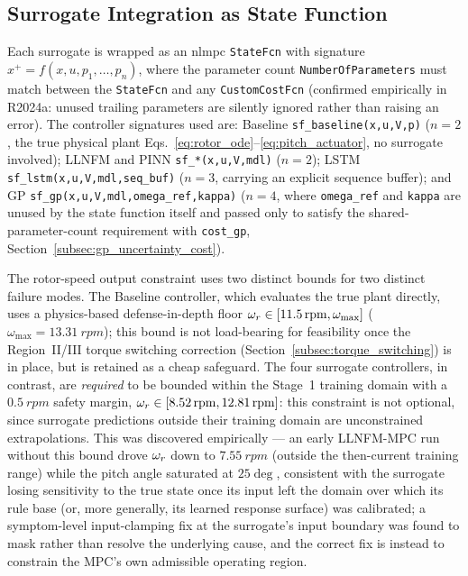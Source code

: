 \subsection{Surrogate Integration as State Function}
\label{subsec:surrogate_integration}

Each surrogate is wrapped as an nlmpc \texttt{StateFcn} with signature
$x^{+} = f(x,u,p_1,\ldots,p_n)$, where the parameter count
\texttt{NumberOfParameters} must match between the \texttt{StateFcn} and
any \texttt{CustomCostFcn} (confirmed empirically in R2024a: unused
trailing parameters are silently ignored rather than raising an error).
The controller signatures used are: Baseline
\texttt{sf\_baseline(x,u,V,p)} ($n=2$, the true physical plant
Eqs.~\eqref{eq:rotor_ode}--\eqref{eq:pitch_actuator}, no surrogate
involved); LLNFM and PINN \texttt{sf\_*(x,u,V,mdl)} ($n=2$); LSTM
\texttt{sf\_lstm(x,u,V,mdl,seq\_buf)} ($n=3$, carrying an explicit sequence
buffer); and GP \texttt{sf\_gp(x,u,V,mdl,omega\_ref,kappa)} ($n=4$, where
\texttt{omega\_ref} and \texttt{kappa} are unused by the state function
itself and passed only to satisfy the shared-parameter-count requirement
with \texttt{cost\_gp}, Section~\ref{subsec:gp_uncertainty_cost}).

The rotor-speed output constraint uses two distinct bounds for two
distinct failure modes. The Baseline controller, which evaluates the true
plant directly, uses a physics-based defense-in-depth floor
$\omega_r \in [\SI{11.5}{rpm}, \omega_{\max}]$
($\omega_{\max}=\SI{13.31}{rpm}$); this bound is not load-bearing for
feasibility once the Region~II/III torque switching correction
(Section~\ref{subsec:torque_switching}) is in place, but is retained as a
cheap safeguard. The four surrogate controllers, in contrast, are
\emph{required} to be bounded within the Stage~1 training domain with a
$\SI{0.5}{rpm}$ safety margin, $\omega_r \in [\SI{8.52}{rpm},
\SI{12.81}{rpm}]$: this constraint is not optional, since surrogate
predictions outside their training domain are unconstrained
extrapolations. This was discovered empirically — an early LLNFM-MPC run
without this bound drove $\omega_r$ down to $\SI{7.55}{rpm}$ (outside the
then-current training range) while the pitch angle saturated at
$25\deg$, consistent with the surrogate losing sensitivity to the true
state once its input left the domain over which its rule base (or, more
generally, its learned response surface) was calibrated; a symptom-level
input-clamping fix at the surrogate's input boundary was found to mask
rather than resolve the underlying cause, and the correct fix is instead
to constrain the MPC's own admissible operating region.

